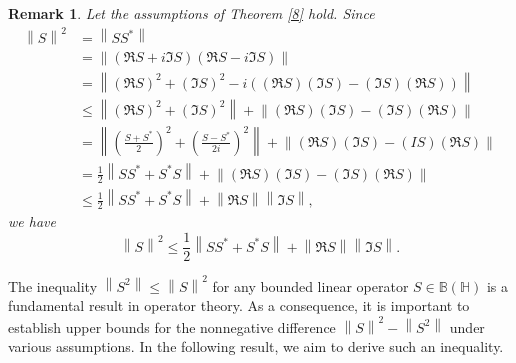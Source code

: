 \documentclass[12pt,twoside,reqno]{amsart}
\newtheorem{remark}{Remark}[section]
\numberwithin{equation}{section}
\begin{document}
\begin{remark}
Let the assumptions of Theorem \ref{8} hold. Since 
\[\begin{aligned}
   {{\left\| S \right\|}^{2}}&=\left\| S{{S}^{*}} \right\| \\ 
 & =\left\| \left( \Re S+i\Im S \right)\left( \Re S-i\Im S \right) \right\| \\ 
 & =\left\| {{\left( \Re S \right)}^{2}}+{{\left( \Im S \right)}^{2}}-i\left( \left( \Re S \right)\left( \Im S \right)-\left( \Im S \right)\left( \Re S \right) \right) \right\| \\ 
 & \le \left\| {{\left( \Re S \right)}^{2}}+{{\left( \Im S \right)}^{2}} \right\|+\left\| \left( \Re S \right)\left( \Im S \right)-\left( \Im S \right)\left( \Re S \right) \right\| \\ 
 & =\left\| {{\left( \frac{S+{{S}^{*}}}{2} \right)}^{2}}+{{\left( \frac{S-{{S}^{*}}}{2i} \right)}^{2}} \right\|+\left\| \left( \Re S \right)\left( \Im S \right)-\left( IS \right)\left( \Re S \right) \right\| \\ 
 & =\frac{1}{2}\left\| S{{S}^{*}}+{{S}^{*}}S \right\|+\left\| \left( \Re S \right)\left( \Im S \right)-\left( \Im S \right)\left( \Re S \right) \right\| \\ 
 & \le \frac{1}{2}\left\| S{{S}^{*}}+{{S}^{*}}S \right\|+\left\| \Re S \right\|\left\| \Im S \right\|,  
\end{aligned}\]
we have
\begin{equation}\label{18}
{{\left\| S \right\|}^{2}}\le \frac{1}{2}\left\| S{{S}^{*}}+{{S}^{*}}S \right\|+\left\| \Re S \right\|\left\| \Im S \right\|.
\end{equation}
\end{remark}




The inequality $\left\| {{S}^{2}} \right\|\le {{\left\| S \right\|}^{2}}$ for any bounded linear operator $S\in \mathbb B\left( \mathbb H \right)$ is a fundamental result in operator theory. As a consequence, it is important to establish upper bounds for the nonnegative difference ${{\left\| S \right\|}^{2}}-\left\| {{S}^{2}} \right\|$ under various assumptions. In the following result, we aim to derive such an inequality.
\end{document}
